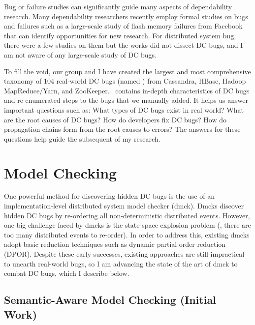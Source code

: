 \documentclass[11pt]{article}
\begin{document}
Bug or failure studies can significantly guide many aspects of dependability
research. Many dependability researchers recently employ formal studies on
bugs and failures such as a large-scale study of flash memory failures from
Facebook that can identify opportunities for new research. For distributed
system bug, there were a few studies on them but the works did not dissect DC
bugs, and I am not aware of any large-scale study of DC bugs. 

To fill the void, our group and I have created the largest and most
comprehensive taxonomy of 104 real-world DC bugs (named \taxdc) from Cassandra,
HBase, Hadoop MapReduce/Yarn, and ZooKeeper. \taxdc\ contains in-depth
characteristics of DC bugs and re-enumerated steps to the bugs that we manually
added. It helps us answer important questions such as: What types of DC
bugs exist in real world? What are the root causes of DC bugs?  How do
developers fix DC bugs? How do propagation chains form from the root causes to
errors? The answers for these questions help guide the subsequent of my
research.



\section{Model Checking}

One powerful method for discovering hidden DC bugs is the use of an
implementation-level distributed system model checker (dmck). Dmcks discover
hidden DC bugs by re-ordering all non-deterministic distributed events.
However, one big challenge faced by dmcks is the state-space explosion problem
(\ie, there are too many distributed events to re-order). In order to address
this, existing dmcks adopt basic reduction techniques such as dynamic partial
order reduction (DPOR). Despite these early successes, existing approaches are
still impractical to unearth real-world bugs, so I am advancing the state of
the art of dmck to combat DC bugs, which I describe below.

\subsection{Semantic-Aware Model Checking (Initial Work)} 
\end{document}
